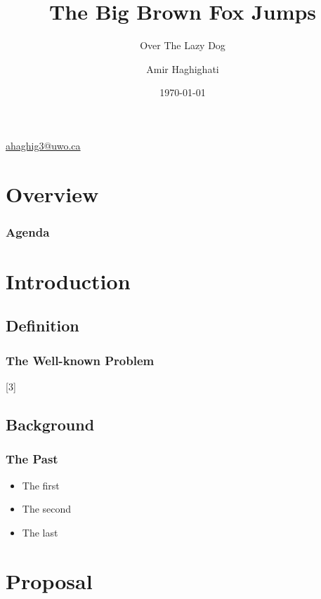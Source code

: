 \documentclass[11pt]{beamer}
\begin{document}
	\author{Amir Haghighati}
	\title{The Big Brown Fox Jumps}
	\subtitle{Over The Lazy Dog}
	\date{\today}
	\subject{Lab Presentations}
	\begin{frame}
	\maketitle
	\centering\tiny\hyperlink{mailto:ahaghig3@uwo.ca}{ahaghig3@uwo.ca}
\end{frame}

\section*{Overview}
\begin{frame}
\frametitle{Agenda}
\tableofcontents
\end{frame}

\section{Introduction}
\subsection{Definition}
\begin{frame}
\frametitle{The Well-known Problem}
\end{frame}

\subsection{Background}
\begin{frame}
\frametitle{The Past}
	\begin{itemize}
		\item<1->The first
		\item<2->The second
		\item<3->The last
	\end{itemize}
\end{frame}

\section{Proposal}
\end{document}
